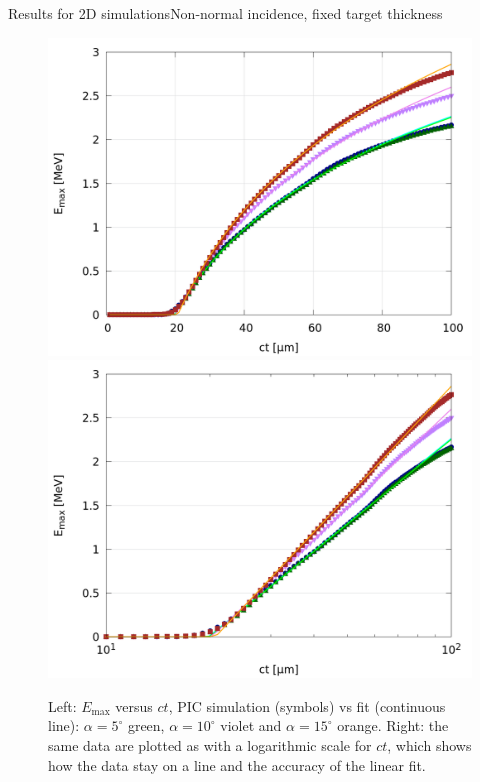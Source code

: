 \documentclass[final]{beamer}
\def\Emax{E_{\mathrm{max}}}
\begin{document}
\begin{frame}{Results for 2D simulations}{Non-normal incidence, fixed target thickness}
\begin{figure}
\includegraphics[width=0.45 \textwidth]{figs/Fig_4a.png}
\hspace{5mm}
\includegraphics[width=0.45 \textwidth]{figs/Fig_4b.png}
\caption{
Left: $\Emax$ versus $ct$, PIC simulation (symbols) vs fit (continuous line): $\alpha=5^{\circ}$ green, $\alpha=10^{\circ}$ violet and $\alpha=15^{\circ}$ orange. Right: the same data are plotted as with a logarithmic scale for $ct$, which shows how the data stay on a line and the accuracy of the linear fit.
}
\end{figure}
\end{frame}
\end{document}
